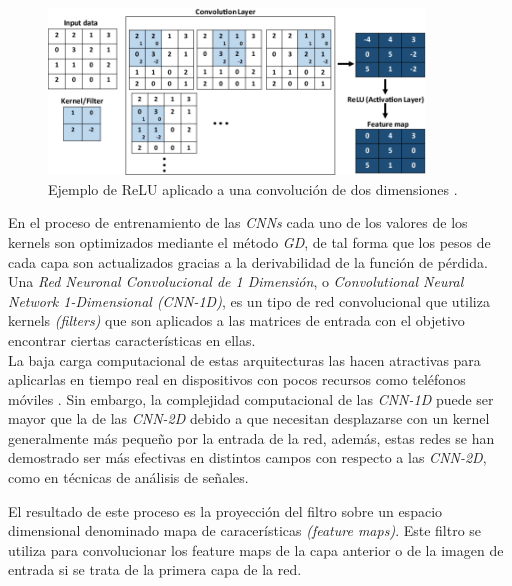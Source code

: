 \begin{itemize}
                        \begin{figure}[h]
                            \centering
                            \includegraphics[width=10cm]{archivos/3.Tecnologias/RedesNeuronales/CNN/CNNRELUImage}
                            \caption{Ejemplo de ReLU aplicado a una convolución de dos dimensiones \cite{CNNReLUImage}.}
                            \label{CNNRELUImage}
                         \end{figure}

                \end{itemize}

                En el proceso de entrenamiento de las \textit{CNNs} cada uno de los valores de los kernels son optimizados mediante el método \textit{GD}, de tal forma que los pesos de cada capa son actualizados gracias a la derivabilidad de la función de pérdida.\\
                                
                Una \textit{Red Neuronal Convolucional de 1 Dimensión}, o \textit{Convolutional Neural Network 1-Dimensional (CNN-1D)}, es un tipo de red convolucional que utiliza kernels \textit{(filters)} que son aplicados a las matrices de entrada con el objetivo encontrar ciertas características en ellas.\\

                La baja carga computacional de estas arquitecturas las hacen atractivas para aplicarlas en tiempo real en dispositivos con pocos recursos como teléfonos móviles \cite{Conv1D_Survey}. Sin embargo, la complejidad computacional de las \textit{CNN-1D} puede ser mayor que la de las \textit{CNN-2D} debido a que necesitan desplazarse con un kernel generalmente más pequeño por la entrada de la red, además, estas redes se han demostrado ser más efectivas en distintos campos con respecto a las \textit{CNN-2D}, como en técnicas de análisis de señales.

                El resultado de este proceso es la proyección del filtro sobre un espacio dimensional denominado mapa de caracerísticas \textit{(feature maps)}. Este filtro se utiliza para convolucionar los feature maps de la capa anterior \cite{FiltersFeatureMaps} o de la imagen de entrada si se trata de la primera capa de la red.
                

